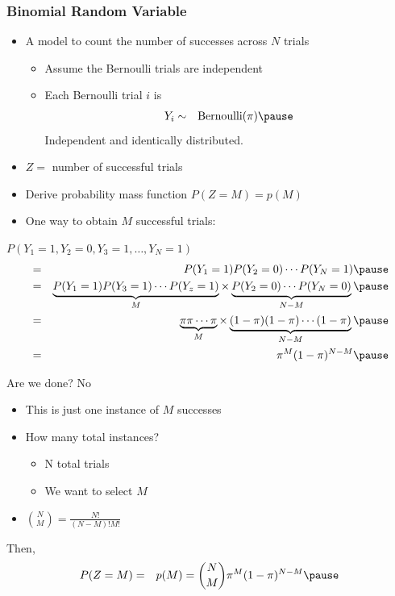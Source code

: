 \documentclass{beamer}
\numberwithin{equation}{section}
\begin{document}
\begin{frame}
\frametitle{Binomial Random Variable}

\begin{itemize}
\item[-] A model to count the number of successes across $N$ trials \pause 
\begin{itemize}
\item[-] Assume the Bernoulli trials are independent \pause 
\item[-] Each Bernoulli trial $i$ is  \pause 
\begin{eqnarray}
Y_{i} & \sim & \text{Bernoulli} (\pi) \nonumber  \pause 
\end{eqnarray}
Independent and identically distributed.   \pause 
\end{itemize}
\item[-] $Z = $ number of successful trials \pause 
\item[-] Derive probability mass function $P(Z = M) = p(M) $ \pause 
\item[-] One way to obtain $M$ successful trials: \pause 
\end{itemize}
$P(Y_{1} = 1, Y_{2}=0, Y_{3} = 1,  \hdots, Y_{N} = 1)$ \pause 
\begin{eqnarray}
 & = & P(Y_{1}=1)P(Y_{2} =0)\cdots P(Y_{N} =1) \pause  \nonumber \\
										& = & \underbrace{P(Y_{1} = 1)P(Y_{3}=1)\cdots P(Y_{z} = 1)}_{M} \times\underbrace{P(Y_{2}= 0) \cdots P(Y_{N} = 0)}_{N-M}  \nonumber \pause  \\										
										& = & \underbrace{\pi \pi \cdots \pi}_{M} \times \underbrace{(1-\pi)(1-\pi) \cdots (1- \pi) }_{N-M} \nonumber \pause  \\
										& = & \pi^{M}(1-\pi)^{N - M} \nonumber \pause  
\end{eqnarray}


\end{frame}


\begin{frame}
Are we done? \pause   \alert{No}  \pause \\
\begin{itemize}
\item[-] This is just one instance of $M$ successes \pause 
\item[-] How many total instances? \pause 
\begin{itemize}
\item[-] N total trials \pause 
\item[-] We want to select $M$  \pause 
\end{itemize}
\item[-] ${{N}\choose{M}} = \frac{N!}{(N-M)! M!}$ \pause 
\end{itemize}
Then,  \pause 
\begin{eqnarray}
P(Z = M) & = &  p(M) = {{N}\choose{M}}\pi^{M} (1- \pi)^{N-M} \nonumber  \pause 
\end{eqnarray}



\end{frame}
\end{document}
